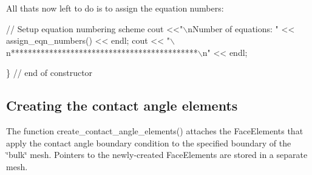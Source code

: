 All that\textquotesingle{}s now left to do is to assign the equation numbers\+:


\begin{DoxyCodeInclude}


 \textcolor{comment}{// Setup equation numbering scheme}
 cout <<\textcolor{stringliteral}{"\(\backslash\)nNumber of equations: "} << assign\_eqn\_numbers() << endl; 
 cout << \textcolor{stringliteral}{"\(\backslash\)n********************************************\(\backslash\)n"} <<  endl;

\} \textcolor{comment}{// end of constructor}

\end{DoxyCodeInclude}




 

\hypertarget{index_create}{}\subsection{Creating the contact angle elements}\label{index_create}
The function {\ttfamily create\+\_\+contact\+\_\+angle\+\_\+elements()} attaches the {\ttfamily Face\+Elements} that apply the contact angle boundary condition to the specified boundary of the \char`\"{}bulk\char`\"{} mesh. Pointers to the newly-\/created {\ttfamily Face\+Elements} are stored in a separate mesh.


